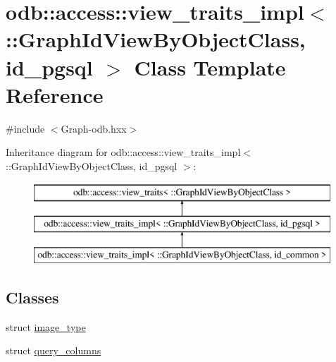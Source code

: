 \hypertarget{classodb_1_1access_1_1view__traits__impl_3_01_1_1_graph_id_view_by_object_class_00_01id__pgsql_01_4}{}\section{odb\+:\+:access\+:\+:view\+\_\+traits\+\_\+impl$<$ \+:\+:Graph\+Id\+View\+By\+Object\+Class, id\+\_\+pgsql $>$ Class Template Reference}
\label{classodb_1_1access_1_1view__traits__impl_3_01_1_1_graph_id_view_by_object_class_00_01id__pgsql_01_4}


{\ttfamily \#include $<$Graph-\/odb.\+hxx$>$}

Inheritance diagram for odb\+:\+:access\+:\+:view\+\_\+traits\+\_\+impl$<$ \+:\+:Graph\+Id\+View\+By\+Object\+Class, id\+\_\+pgsql $>$\+:\begin{figure}[H]
\begin{center}
\leavevmode
\includegraphics[height=3.000000cm]{d2/d47/classodb_1_1access_1_1view__traits__impl_3_01_1_1_graph_id_view_by_object_class_00_01id__pgsql_01_4}
\end{center}
\end{figure}
\subsection*{Classes}
\begin{DoxyCompactItemize}
\item 
struct \hyperlink{structodb_1_1access_1_1view__traits__impl_3_01_1_1_graph_id_view_by_object_class_00_01id__pgsql_01_4_1_1image__type}{image\+\_\+type}
\item 
struct \hyperlink{structodb_1_1access_1_1view__traits__impl_3_01_1_1_graph_id_view_by_object_class_00_01id__pgsql_01_4_1_1query__columns}{query\+\_\+columns}
\end{DoxyCompactItemize}
